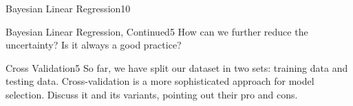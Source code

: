 \begin{questions}
\begin{question}{Bayesian Linear Regression}{10}
\begin{answer}
\end{answer}
\end{question}


\begin{question}{Bayesian Linear Regression, Continued}{5}
How can we further reduce the uncertainty? Is it always a good practice?

\begin{answer}\end{answer}
\end{question}


\begin{question}[bonus]{Cross Validation}{5}
So far, we have split our dataset in two sets: training data and testing data. Cross-validation is a more sophisticated approach for model selection. Discuss it and its variants, pointing out their pro and cons.
\end{question}

\begin{answer}\end{answer}

\end{questions}
